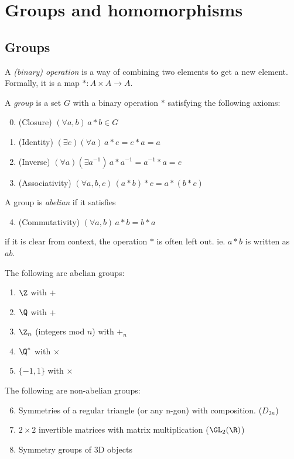 \documentclass[a4paper]{article}
\begin{document}
\section{Groups and homomorphisms}
\subsection{Groups}
\begin{defi}
  A \emph{(binary) operation} is a way of combining two elements to get a new element. Formally, it is a map $*: A \times A \rightarrow A$.
\end{defi}
\begin{defi}[Group]
  A \emph{group} is a set $G$ with a binary operation $*$ satisfying the following axioms:
  \begin{enumerate}[label=\arabic{*}.]
      \setcounter{enumi}{-1}
    \item (Closure) $(\forall a, b)\, a*b\in G$
    \item (Identity) $(\exists e)(\forall a)\, a*e = e*a = a$
    \item (Inverse) $(\forall a)(\exists a^{-1})\, a*a^{-1} = a^{-1}*a = e$
    \item (Associativity) $(\forall a, b, c)\, (a*b)*c = a*(b*c)$
  \end{enumerate}
\end{defi}
\begin{defi}
  A group is \emph{abelian} if it satisfies
  \begin{enumerate}[label=\arabic{*}.]
      \setcounter{enumi}{3}
    \item (Commutativity) $(\forall a, b)\, a*b = b*a$
  \end{enumerate}
\end{defi}
\note if it is clear from context, the operation $*$ is often left out. ie. $a*b$ is written as $ab$.
\begin{eg}
  The following are abelian groups:
  \begin{enumerate}
    \item $\Z$ with +
    \item $\Q$ with +
    \item $\Z_n$ (integers mod $n$) with $+_n$
    \item $\Q^*$ with $\times$
    \item $\{-1, 1\}$ with $\times$
  \end{enumerate}
  The following are non-abelian groups:
  \begin{enumerate}
      \setcounter{enumi}{5}
    \item Symmetries of a regular triangle (or any n-gon) with composition. ($D_{2n}$)
    \item $2\times 2$ invertible matrices with matrix multiplication ($\GL_2(\R)$)
    \item Symmetry groups of 3D objects
  \end{enumerate}
\end{eg}
\end{document}
